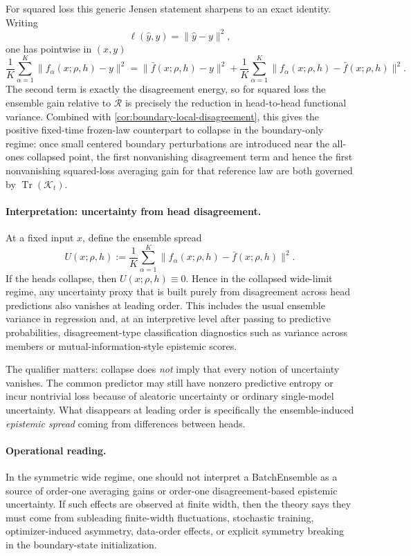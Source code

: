 \documentclass[11pt]{article}
\theoremstyle{definition}
\begin{document}
For squared loss this generic Jensen statement sharpens to an exact identity.
Writing
\[
  \ell(\widehat y,y)=\|\widehat y-y\|^2,
\]
one has pointwise in $(x,y)$
\[
  \frac1K\sum_{\alpha=1}^K \|f_\alpha(x;\rho,h)-y\|^2
  =
  \|\bar f(x;\rho,h)-y\|^2
  +
  \frac1K\sum_{\alpha=1}^K \|f_\alpha(x;\rho,h)-\bar f(x;\rho,h)\|^2.
\]
The second term is exactly the disagreement energy, so for squared loss the
ensemble gain relative to $\overline{\mathcal R}$ is precisely the reduction in
head-to-head functional variance.
Combined with \cref{cor:boundary-local-disagreement}, this gives the positive
fixed-time frozen-law counterpart to collapse in the boundary-only regime: once
small centered boundary perturbations are introduced near the all-ones
collapsed point, the first nonvanishing disagreement term and hence the first
nonvanishing squared-loss averaging gain for that reference law are both
governed by
$\operatorname{Tr}(\mathcal K_t)$.

\paragraph{Interpretation: uncertainty from head disagreement.}
At a fixed input $x$, define the ensemble spread
\[
  U(x;\rho,h)
  :=
  \frac1K\sum_{\alpha=1}^K
  \|f_\alpha(x;\rho,h)-\bar f(x;\rho,h)\|^2.
\]
If the heads collapse, then $U(x;\rho,h)\equiv 0$. Hence in the collapsed
wide-limit regime, any uncertainty proxy that is built purely from disagreement
across head predictions also vanishes at leading order. This includes the usual
ensemble variance in regression and, at an interpretive level after passing to
predictive probabilities, disagreement-type classification diagnostics such as
variance across members or mutual-information-style epistemic scores.

The qualifier matters: collapse does \emph{not} imply that every notion of
uncertainty vanishes. The common predictor may still have nonzero predictive
entropy or incur nontrivial loss because of aleatoric uncertainty or ordinary
single-model uncertainty. What disappears at leading order is specifically the
ensemble-induced \emph{epistemic spread} coming from differences between heads.

\paragraph{Operational reading.}
In the symmetric wide regime, one should not interpret a BatchEnsemble as a
source of order-one averaging gains or order-one disagreement-based epistemic
uncertainty. If such effects are observed at finite width, then the theory says
they must come from subleading finite-width fluctuations, stochastic training,
optimizer-induced asymmetry, data-order effects, or explicit symmetry breaking
in the boundary-state initialization.
\end{document}
